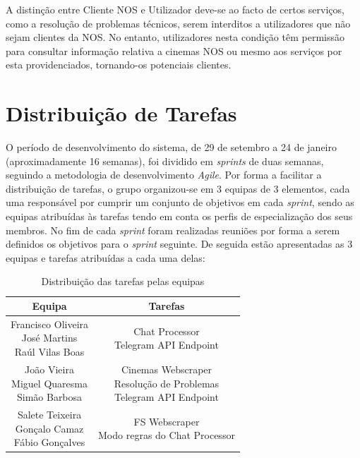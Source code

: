 \documentclass[11pt,a4paper]{article}
\begin{document}
A distinção entre Cliente NOS e Utilizador deve-se ao facto de certos serviços, como a resolução
de problemas técnicos, serem interditos a utilizadores que não sejam clientes da NOS. No entanto,
utilizadores nesta condição têm permissão para consultar informação relativa a cinemas NOS ou mesmo
aos serviços por esta providenciados, tornando-os potenciais clientes.

\section{Distribuição de Tarefas}

O período de desenvolvimento do sistema, de 29 de setembro a 24 de janeiro (aproximadamente 16 semanas), foi
dividido em \textit{sprints} de duas semanas, seguindo a metodologia de desenvolvimento \textit{Agile}. 
Por forma a facilitar a distribuição de tarefas, o grupo organizou-se em 3 equipas de 3 elementos,
cada uma responsável por cumprir um conjunto de objetivos em cada \textit{sprint}, sendo 
as equipas atribuídas às tarefas tendo em conta os perfis de especialização dos seus membros.
No fim de cada \textit{sprint} foram realizadas reuniões por forma a serem definidos os objetivos para o 
\textit{sprint} seguinte.
De seguida estão apresentadas as 3 equipas e tarefas atribuídas a cada uma delas:

\begin{table}[H]
    \centering
    \footnotesize
    \begin{tabular}{| c | c |}
        \hline
        Equipa & Tarefas \\ \hline
        \makecell{Francisco Oliveira\\ José Martins\\ Raúl Vilas Boas} & \makecell{Chat Processor \\ Telegram API Endpoint} \\ \hline
        \makecell{João Vieira\\ Miguel Quaresma\\ Simão Barbosa} & \makecell{Cinemas Webscraper \\ Resolução de Problemas \\ Telegram API Endpoint} \\ \hline
        \makecell{Salete Teixeira\\ Gonçalo Camaz\\ Fábio Gonçalves} & \makecell{FS Webscraper \\ Modo regras do Chat Processor} \\ \hline
    \end{tabular}
    \caption{Distribuição das tarefas pelas equipas}
\end{table}
\end{document}

